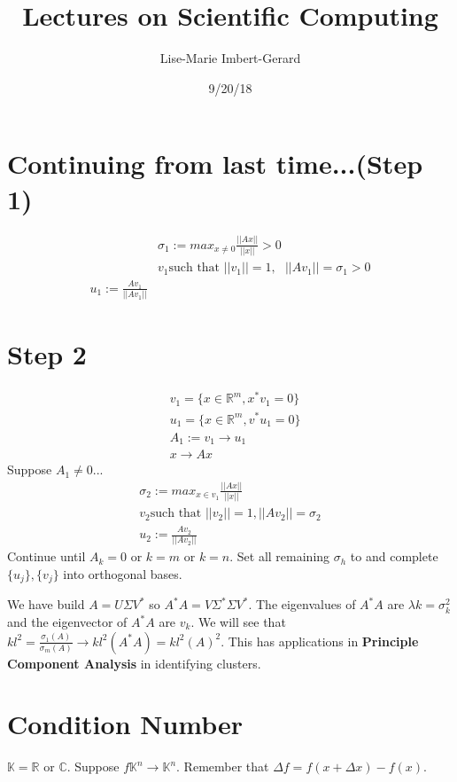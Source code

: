 \documentclass{article}
\title{Lectures on Scientific Computing}
\date{9/20/18}
\author{Lise-Marie Imbert-Gerard}
\newcommand{\n}{\newline}
\begin{document}
	\maketitle
	\section{Continuing from last time...(Step 1)}
	\begin{align*}
		&\sigma_{1}:=max_{x\neq 0}\frac{||Ax||}{||x||}>0\\
		&v_{1} \text{such that }||v_{1}||=1, \text{ }||Av_{1}||=\sigma_{1}>0\\
		u_{1}:=\frac{Av_{1}}{||Av_{1}||}
	\end{align*}
	\section{Step 2}
	\begin{align*}
	&v_{1}=\{x\in\mathbb{R}^{m},x^{*}v_{1}=0\}\\
	&u_{1}=\{x\in\mathbb{R}^{m},v^{*}u_{1}=0\}\\
	&A_{1}:=v_{1}\rightarrow u_{1}\\
	&x\rightarrow Ax
	\end{align*}
	Suppose $A_{1}\neq0$...\n
	\begin{align*}
		\sigma_{2}:=max_{x\in v_{1}}\frac{||Ax||}{||x||}\\
		v_{2} \text{such that }||v_{2}||=1,||Av_{2}||=\sigma_{2}\\
		u_{2}:=\frac{Av_{2}}{||Av_{2}||}
	\end{align*}
	Continue until $A_{k}=0$ or $k=m$ or $k=n$.  Set all remaining $\sigma_{h}$ to and complete $\{u_{j}\},\{v_{j}\}$ into orthogonal bases.\n

	We have build $A=U\Sigma V^{*}$ so $A^{*}A=V\Sigma^{*}\Sigma V^{*}$.  The eigenvalues of $A^{*}A$ are $\lambda k=\sigma_{k}^{2}$ and the eigenvector of $A^{*}A$ are $v_{k}$.  We will see that $kl^{2}=\frac{\sigma_{1}(A)}{\sigma_{m}(A)}\rightarrow kl^{2}(A^{*}A)=kl^{2}(A)^2$.  This has applications in \textbf{Principle Component Analysis} in identifying clusters.

	\section{Condition Number}
	$\mathbb{K}=\mathbb{R}$ or $\mathbb{C}$.  Suppose $f\mathbb{K}^{n}\rightarrow\mathbb{K}^{n}$.  Remember that $\Delta f=f(x+\Delta x)-f(x)$. \n
	
\end{document}

